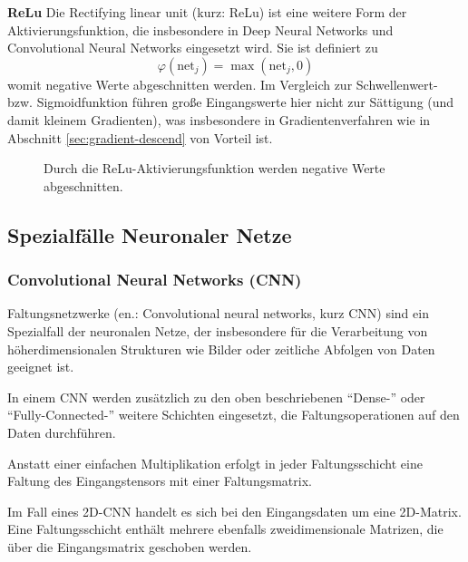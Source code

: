 		\textbf{ReLu}
		Die Rectifying linear unit (kurz: ReLu) ist eine weitere Form der Aktivierungsfunktion, die insbesondere in Deep Neural Networks und Convolutional Neural Networks eingesetzt wird. Sie ist definiert zu
		\begin{equation}
			\label{eq:relu_def}
			\varphi(\text{net}_j) = \max(\text{net}_j, 0)
		\end{equation}
		womit negative Werte abgeschnitten werden. Im Vergleich zur Schwellenwert- bzw. Sigmoidfunktion führen große Eingangswerte hier nicht zur Sättigung (und damit kleinem Gradienten), was insbesondere in Gradientenverfahren wie in Abschnitt \ref{sec:gradient-descend} von Vorteil ist. \\
		
		\begin{figure}[ht]
			\centering
		\caption{Durch die ReLu-Aktivierungsfunktion werden negative Werte abgeschnitten.}
		\label{fig:relu_plot}
		\end{figure}

	
	\subsection { Spezialfälle Neuronaler Netze}
		\subsubsection { Convolutional Neural Networks (CNN) }
		Faltungsnetzwerke (en.: Convolutional neural networks, kurz CNN) sind ein Spezialfall der neuronalen Netze, der insbesondere für die Verarbeitung von höherdimensionalen Strukturen wie Bilder oder zeitliche Abfolgen von Daten geeignet ist. 
		
		In einem CNN werden zusätzlich zu den oben beschriebenen "`Dense-"' oder "`Fully-Connected-"' weitere Schichten eingesetzt, die Faltungsoperationen auf den Daten durchführen.
		
		Anstatt einer einfachen Multiplikation erfolgt in jeder Faltungsschicht eine Faltung des Eingangstensors mit einer Faltungsmatrix.
		
		Im Fall eines 2D-CNN handelt es sich bei den Eingangsdaten um eine 2D-Matrix. Eine Faltungsschicht enthält mehrere ebenfalls zweidimensionale Matrizen, die über die Eingangsmatrix geschoben werden. 
		
